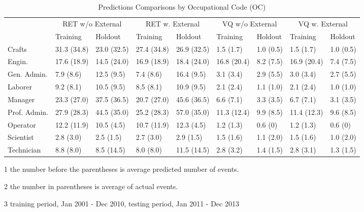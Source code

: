 \begin{table}[h!]
	\centering
	\scriptsize
	\smallskip
	\caption{Predictions Comparisons by Occupational Code (OC)}
	\begin{threeparttable}
		\begin{tabular}{lllllllll}
			\toprule
			& \multicolumn{2}{c}{RET w/o External} & \multicolumn{2}{c}{RET w. External} & \multicolumn{2}{c}{VQ w/o External} & \multicolumn{2}{c}{VQ w. External} \\  \cline{2-9}
			& Training & Holdout & Training & Holdout & Training & Holdout & Training & Holdout \\ \midrule
			Crafts  & 31.3\tnote{1} (34.8)\tnote{2} & 23.0 (32.5) & 27.4 (34.8) & 26.9 (32.5) & 1.5 (1.7) & 1.0 (0.5) & 1.5 (1.7) & 1.0 (0.5) \\
			Engin.    & 17.6 (18.9) & 14.5 (24.0) & 16.9 (18.9) & 18.4 (24.0) & 16.8 (20.4) & 8.2 (7.5) & 16.9 (20.4) & 7.4 (7.5) \\
			Gen. Admin. & 7.9 (8.6) & 12.5 (9.5) & 7.4 (8.6) & 16.4 (9.5) & 3.1 (3.4) & 2.9 (5.5) & 3.0 (3.4) & 2.7 (5.5) \\
			Laborer     & 9.2 (8.1) & 10.5 (9.5) & 8.5 (8.1) & 10.9 (9.5) & 2.1 (2.4) & 1.1 (1.0) & 2.1 (2.4) & 1.0 (1.0) \\
			Manager     & 23.3 (27.0) & 37.5 (36.5) & 20.7 (27.0) & 45.6 (36.5) & 6.6 (7.1) & 3.3 (3.5) & 6.7 (7.1) & 3.1 (3.5) \\
			Prof. Admin.     & 27.9 (28.3) & 44.5 (35.0) & 25.2 (28.3) & 57.0 (35.0) & 11.3 (12.4) & 9.9 (8.5) & 11.4 (12.3) & 9.6 (8.5) \\
			Operator     & 12.2 (11.9) & 10.5 (4.5) & 10.7 (11.9) & 12.3 (4.5) & 1.2 (1.3) & 0.6 (0) & 1.2 (1.3) & 0.6 (0) \\
			Scientist     & 2.8 (3.0) & 2.5 (1.5) & 2.7 (3.0) & 2.9 (1.5) & 1.5 (1.6) & 1.1 (2.0) & 1.5 (1.6) & 1.0 (2.0) \\
			Technician     & 8.8 (8.0) & 8.5 (14.5) & 8.0 (8.0) & 11.5 (14.5) & 2.8 (3.2) & 1.4 (1.5) & 2.8 (3.1) & 1.3 (1.5) \\
			\bottomrule
		\end{tabular}%
	\begin{tablenotes}
		\item[1] the number before the parentheses is average predicted number of events.
		\item[2] the number in parentheses is average of actual events.
		\item[3] training period, Jan 2001 - Dec 2010, testing period, Jan 2011 - Dec 2013
	\end{tablenotes}
		\end{threeparttable}
		\label{tab:cocscode}
	\end{table}
	
